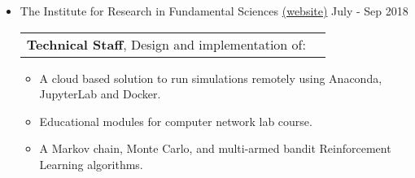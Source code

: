 \documentclass[a4paper,10pt]{article} %
\begin{document}
\begin{itemize}
\begin{itemize}
	 	\item 
	 	\textcolor{blue(ryb)}{The Institute for Research in Fundamental Sciences} \href{http://cs.ipm.ac.ir}{(website)} \hfill July - Sep 2018 \\
	 	\begin{tabular}{lr}
	 		{\bf Technical Staff}, Design and implementation of: & \\
	 	\end{tabular}
	 	\begin{itemize}
	 		\item A cloud based solution to run simulations remotely using Anaconda, JupyterLab and Docker.
	 		\item Educational modules for computer network lab course.
	 		\item A Markov chain, Monte Carlo, and multi-armed bandit Reinforcement Learning algorithms. \\
	 	\end{itemize}
	 	
	 \end{itemize}
\end{itemize}
\end{document}
